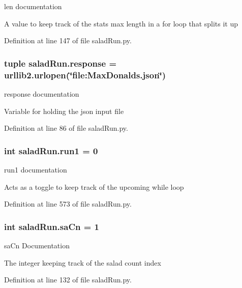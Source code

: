 len documentation 

A value to keep track of the stats max length in a for loop that splits it up 

Definition at line 147 of file salad\-Run.\-py.

\hypertarget{namespacesaladRun_a6c2592efb8e8eefc75704ab8ec52e8d9}{
\subsubsection[{response}]{\setlength{\rightskip}{0pt plus 5cm}tuple salad\-Run.\-response = urllib2.\-urlopen(\char`\"{}file\-:\-Max\-Donalds.\-json\char`\"{})}}\label{namespacesaladRun_a6c2592efb8e8eefc75704ab8ec52e8d9}


response documentation 

Variable for holding the json input file 

Definition at line 86 of file salad\-Run.\-py.

\hypertarget{namespacesaladRun_abec8102fec477601e58a24835fe2b248}{
\subsubsection[{run1}]{\setlength{\rightskip}{0pt plus 5cm}int salad\-Run.\-run1 = 0}}\label{namespacesaladRun_abec8102fec477601e58a24835fe2b248}


run1 documentation 

Acts as a toggle to keep track of the upcoming while loop 

Definition at line 573 of file salad\-Run.\-py.

\hypertarget{namespacesaladRun_a65ac5c79695e5562c8496459009a74e0}{
\subsubsection[{sa\-Cn}]{\setlength{\rightskip}{0pt plus 5cm}int salad\-Run.\-sa\-Cn = 1}}\label{namespacesaladRun_a65ac5c79695e5562c8496459009a74e0}


sa\-Cn Documentation 

The integer keeping track of the salad count index 

Definition at line 132 of file salad\-Run.\-py.


